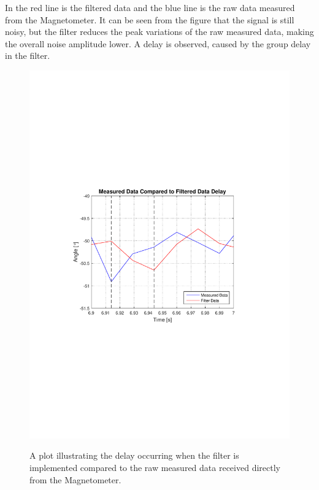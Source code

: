 In  the red line is the filtered data and the blue line is the raw data measured from the Magnetometer. It can be seen from the figure that the signal is still noisy, but the filter reduces the peak variations of the raw measured data, making the overall noise amplitude lower. A delay is observed, caused by the group delay in the filter.

\begin{figure}[H]
  \centering
  {
    \includegraphics[width=1.2\textwidth]{figures/FinalimplementationFilterDelay.pdf}
  }
  \caption{A plot illustrating the delay occurring when the filter is implemented compared to the raw measured data received directly from the Magnetometer.}
  \label{fig:FinalimplementationFilterDelay}
\end{figure}\vspace{-5mm}

